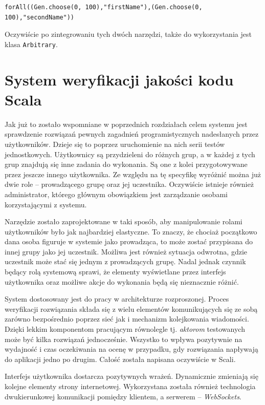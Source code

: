 \documentclass[wimgr]{xmgr}
\begin{document}
\begin{verbatim}
forAll((Gen.choose(0, 100),"firstName"),(Gen.choose(0, 100),"secondName"))
\end{verbatim}

Oczywiście po zintegrowaniu tych dwóch narzędzi, także do wykorzystania jest klasa \texttt{Arbitrary}.

\chapter{System weryfikacji jakości kodu Scala}

Jak już to zostało wspomniane w poprzednich rozdziałach celem systemu jest sprawdzenie rozwiązań pewnych zagadnień programistycznych nadesłanych przez użytkowników. Dzieje się to poprzez uruchomienie na nich serii testów jednostkowych. Użytkownicy są przydzieleni do różnych grup, a w każdej z tych grup znajdują się inne zadania do wykonania. Są one z kolei przygotowywane przez jeszcze innego użytkownika. Ze względu na tę specyfikę wyróżnić można już dwie role -- prowadzącego grupę oraz jej uczestnika. Oczywiście istnieje również administrator, którego głównym obowiązkiem jest zarządzanie osobami korzystającymi z systemu.

Narzędzie zostało zaprojektowane w taki sposób, aby manipulowanie rolami użytkowników było jak najbardziej elastyczne. To znaczy, że chociaż początkowo dana osoba figuruje w systemie jako prowadząca, to może zostać przypisana do innej grupy jako jej uczestnik. Możliwa jest również sytuacja odwrotna, gdzie uczestnik może stać się jednym z prowadzących grupę. Nadal jednak czynnik będący rolą systemową sprawi, że elementy wyświetlane przez interfejs użytkownika oraz możliwe akcje do wykonania będą się nieznacznie różnić.

System dostosowany jest do pracy w architekturze rozproszonej. Proces weryfikacji rozwiązania składa się z wielu elementów komunikujących się ze sobą zarówno bezpośrednio poprzez sieć jak i mechanizm kolejkowania wiadomości. Dzięki lekkim komponentom pracującym równolegle tj. \emph{aktorom} testowanych może być kilka rozwiązań jednocześnie. Wszystko to wpływa pozytywnie na wydajność i czas oczekiwania na ocenę w przypadku, gdy rozwiązania napływają do aplikacji jedno po drugim. Całość została napisana oczywiście w Scali. 
 
Interfejs użytkownika dostarcza pozytywnych wrażeń. Dynamicznie zmieniają się kolejne elementy strony internetowej. Wykorzystana została również technologia dwukierunkowej komunikacji pomiędzy klientem, a serwerem -- \emph{WebSockets}. 
\end{document}
